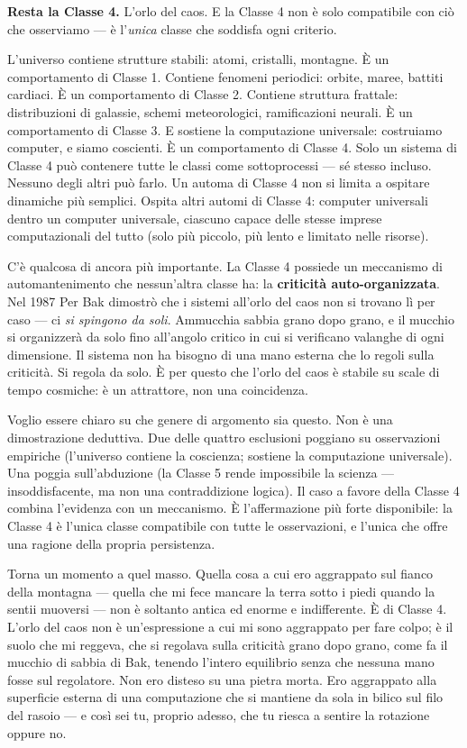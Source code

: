 \documentclass[11pt, twoside, openright]{book}
\begin{document}
\textbf{Resta la Classe 4.} L'orlo del caos. E la Classe 4 non è solo compatibile con ciò che osserviamo --- è l'\textit{unica} classe che soddisfa ogni criterio.

L'universo contiene strutture stabili: atomi, cristalli, montagne. È un comportamento di Classe 1. Contiene fenomeni periodici: orbite, maree, battiti cardiaci. È un comportamento di Classe 2. Contiene struttura frattale: distribuzioni di galassie, schemi meteorologici, ramificazioni neurali. È un comportamento di Classe 3. E sostiene la computazione universale: costruiamo computer, e siamo coscienti. È un comportamento di Classe 4. Solo un sistema di Classe 4 può contenere tutte le classi come sottoprocessi --- sé stesso incluso. Nessuno degli altri può farlo. Un automa di Classe 4 non si limita a ospitare dinamiche più semplici. Ospita altri automi di Classe 4: computer universali dentro un computer universale, ciascuno capace delle stesse imprese computazionali del tutto (solo più piccolo, più lento e limitato nelle risorse).

C'è qualcosa di ancora più importante. La Classe 4 possiede un meccanismo di automantenimento che nessun'altra classe ha: la \textbf{criticità auto-organizzata}. Nel 1987 Per Bak dimostrò che i sistemi all'orlo del caos non si trovano lì per caso --- ci \textit{si spingono da soli}. Ammucchia sabbia grano dopo grano, e il mucchio si organizzerà da solo fino all'angolo critico in cui si verificano valanghe di ogni dimensione. Il sistema non ha bisogno di una mano esterna che lo regoli sulla criticità. Si regola da solo. È per questo che l'orlo del caos è stabile su scale di tempo cosmiche: è un attrattore, non una coincidenza.

Voglio essere chiaro su che genere di argomento sia questo. Non è una dimostrazione deduttiva. Due delle quattro esclusioni poggiano su osservazioni empiriche (l'universo contiene la coscienza; sostiene la computazione universale). Una poggia sull'abduzione (la Classe 5 rende impossibile la scienza --- insoddisfacente, ma non una contraddizione logica). Il caso a favore della Classe 4 combina l'evidenza con un meccanismo. È l'affermazione più forte disponibile: la Classe 4 è l'unica classe compatibile con tutte le osservazioni, e l'unica che offre una ragione della propria persistenza.

Torna un momento a quel masso. Quella cosa a cui ero aggrappato sul fianco della montagna --- quella che mi fece mancare la terra sotto i piedi quando la sentii muoversi --- non è soltanto antica ed enorme e indifferente. È di Classe 4. L'orlo del caos non è un'espressione a cui mi sono aggrappato per fare colpo; è il suolo che mi reggeva, che si regolava sulla criticità grano dopo grano, come fa il mucchio di sabbia di Bak, tenendo l'intero equilibrio senza che nessuna mano fosse sul regolatore. Non ero disteso su una pietra morta. Ero aggrappato alla superficie esterna di una computazione che si mantiene da sola in bilico sul filo del rasoio --- e così sei tu, proprio adesso, che tu riesca a sentire la rotazione oppure no.
\end{document}
